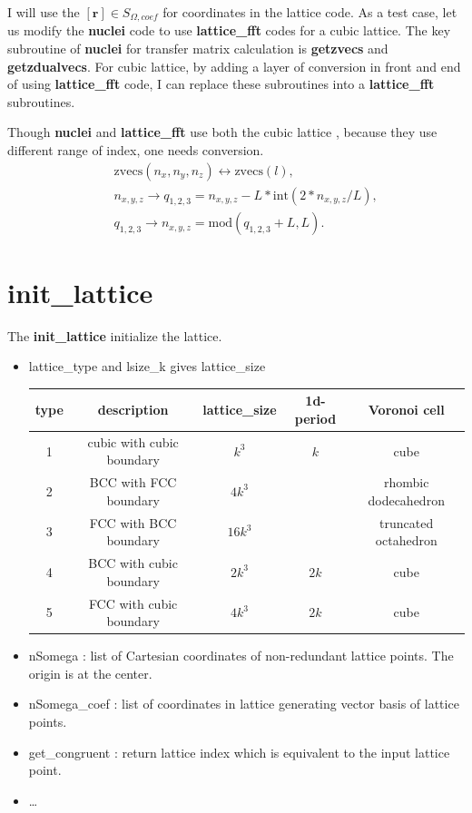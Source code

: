 \documentclass[10pt]{book}
\def\bm{\boldsymbol}
\newcommand{\bea}{\begin{eqnarray}}
\newcommand{\eea}{\end{eqnarray}}
\newcommand{\no}{\nonumber \\}
\begin{document}
  I will use the $[{\bm r}]\in S_{\Omega,coef}$ for coordinates in the lattice code.
As a test case, let us modify the {\bf nuclei} code to use {\bf lattice\_fft} codes
for a cubic lattice.
The key subroutine of {\bf nuclei} for transfer matrix calculation 
is {\bf getzvecs} and {\bf getzdualvecs}. 
For cubic lattice, by adding a layer of conversion in front and end of using 
{\bf lattice\_fft} code, I can replace these subroutines into a  {\bf lattice\_fft} subroutines. 

Though {\bf nuclei} and {\bf lattice\_fft} use both the cubic lattice , 
because they use different range of index,
one needs conversion. 
\bea 
& &\mbox{zvecs}(n_x,n_y,n_z)\leftrightarrow \mbox{zvecs}(l),\no 
& & n_{x,y,z}\to  q_{1,2,3}=n_{x,y,z}-L*\mbox{int}(2*n_{x,y,z}/L) , \no 
& & q_{1,2,3} \to n_{x,y,z}=\mbox{mod}(q_{1,2,3}+L,L). 
\eea 

\section{init\_lattice} 
The {\bf init\_lattice} initialize the lattice.
\begin{itemize}
	\item lattice\_type and lsize\_k gives lattice\_size
	
	\begin{tabular}{c c c c c}
		type & description               & lattice\_size  & 1d-period & Voronoi cell\\
		\hline
		1    & cubic with cubic boundary &  $k^3$     &    $k$  & cube  \\
		2    & BCC with FCC boundary     &  $4k^3$    &         & rhombic dodecahedron  \\
		3    & FCC with BCC boundary     &  $16k^3$   &         & truncated octahedron  \\
		4    & BCC with cubic boundary   &  $2k^3$    &   $2k$  & cube   \\
		5    & FCC with cubic boundary   &  $4k^3$    &   $2k$  & cube  \\ 
	\end{tabular}

    \item nSomega : list of Cartesian coordinates of non-redundant lattice points. The origin is at the center. 
    \item nSomega\_coef : list of coordinates in lattice generating vector basis of lattice points.  
    \item get\_congruent : return lattice index which is equivalent to the input lattice point. 
    \item \dots 
	
\end{itemize}
\end{document}
